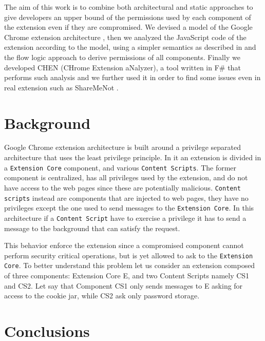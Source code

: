 The aim of this work is to combine both architectural and static approaches to give developers an upper bound of the permissions used by each component of the extension even if they are compromised. We devised a model of the Google Chrome extension architecture  \cite{ChromeExtensionAPI}, then we analyzed the JavaScript code of the extension according to the model, using a simpler semantics as described in \cite{LambdaJS} and the flow logic approach to derive permissions of all components. Finally we developed CHEN (CHrome Extension aNalyzer), a tool written in F\# that performs such analysis and we further used it in order to find some issues even in real extension such as ShareMeNot \cite{ShareMeNot}.

\section{Background}
Google Chrome extension architecture is built around a privilege separated architecture that uses the least privilege principle. In it an extension is divided in a \texttt{Extension Core} component, and various \texttt{Content Scripts}. The former component is centralized, has all privileges used by the extension, and do not have access to the web pages since these are potentially malicious. \texttt{Content scripts} instead are components that are injected to web pages, they have no privileges except the one used to send messages to the \texttt{Extension Core}. In this architecture if a \texttt{Content Script} have to exercise a privilege it has to send a message to the background that can satisfy the request.

This behavior enforce the extension since a compromised component cannot perform security critical operations, but is yet allowed to ask to the \texttt{Extension Core}. To better understand this problem let us consider an extension composed of three components: Extension Core E, and two Content Scripts namely CS1 and CS2. Let say that Component CS1 only sends messages to E asking for access to the cookie jar, while CS2 ask only password storage.


\section{Conclusions}
